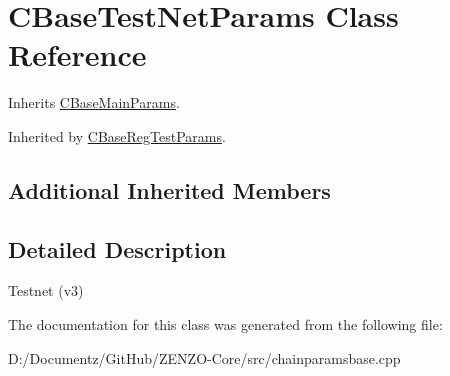 \hypertarget{class_c_base_test_net_params}{}\section{C\+Base\+Test\+Net\+Params Class Reference}
\label{class_c_base_test_net_params}


Inherits \mbox{\hyperlink{class_c_base_main_params}{C\+Base\+Main\+Params}}.



Inherited by \mbox{\hyperlink{class_c_base_reg_test_params}{C\+Base\+Reg\+Test\+Params}}.

\subsection*{Additional Inherited Members}


\subsection{Detailed Description}
Testnet (v3) 

The documentation for this class was generated from the following file\+:\begin{DoxyCompactItemize}
\item 
D\+:/\+Documentz/\+Git\+Hub/\+Z\+E\+N\+Z\+O-\/\+Core/src/chainparamsbase.\+cpp\end{DoxyCompactItemize}
